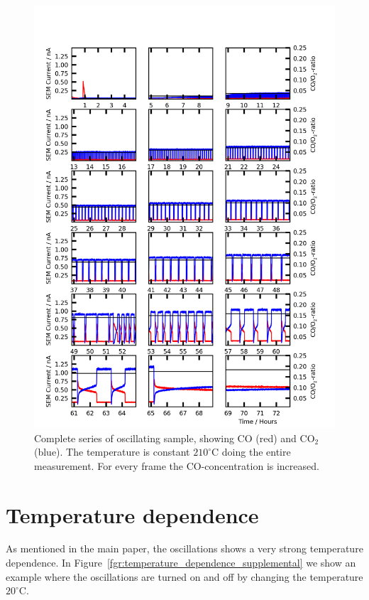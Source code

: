 \documentclass[8.5pt,twoside,twocolumn]{article}
\begin{document}
\begin{figure}
  \centering
  \includegraphics[width=14cm]{oscillations_gas_dependence_supplemental.png}
  \caption{Complete series of oscillating sample, showing CO (red) and CO$_2$ (blue). The temperature is constant $210^\circ$C doing the entire measurement. For every frame the CO-concentration is increased.}
  \label{fgr:gas_dependence}
\end{figure}

\section{Temperature dependence}
As mentioned in the main paper, the oscillations shows a very strong temperature dependence. In Figure~\ref{fgr:temperature_dependence_supplemental} we show an example where the oscillations are turned on and off by changing the temperature $20^\circ$C.
\end{document}
